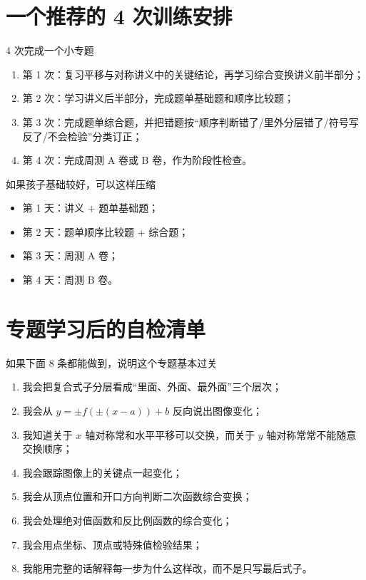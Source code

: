 \documentclass[11pt,a4paper,fontset=fandol]{ctexart}
\begin{document}
\section{一个推荐的 4 次训练安排}

\begin{goalbox}{4 次完成一个小专题}
\begin{enumerate}
  \item 第 1 次：复习平移与对称讲义中的关键结论，再学习综合变换讲义前半部分；
  \item 第 2 次：学习讲义后半部分，完成题单基础题和顺序比较题；
  \item 第 3 次：完成题单综合题，并把错题按“顺序判断错了/里外分层错了/符号写反了/不会检验”分类订正；
  \item 第 4 次：完成周测 A 卷或 B 卷，作为阶段性检查。
\end{enumerate}
\end{goalbox}

\begin{infobox}{如果孩子基础较好，可以这样压缩}
\begin{itemize}
  \item 第 1 天：讲义 + 题单基础题；
  \item 第 2 天：题单顺序比较题 + 综合题；
  \item 第 3 天：周测 A 卷；
  \item 第 4 天：周测 B 卷。
\end{itemize}
\end{infobox}

\section{专题学习后的自检清单}

\begin{goalbox}{如果下面 8 条都能做到，说明这个专题基本过关}
\begin{enumerate}
  \item 我会把复合式子分层看成“里面、外面、最外面”三个层次；
  \item 我会从 \(y=\pm f(\pm(x-a))+b\) 反向说出图像变化；
  \item 我知道关于 \(x\) 轴对称常和水平平移可以交换，而关于 \(y\) 轴对称常常不能随意交换顺序；
  \item 我会跟踪图像上的关键点一起变化；
  \item 我会从顶点位置和开口方向判断二次函数综合变换；
  \item 我会处理绝对值函数和反比例函数的综合变化；
  \item 我会用点坐标、顶点或特殊值检验结果；
  \item 我能用完整的话解释每一步为什么这样改，而不是只写最后式子。
\end{enumerate}
\end{goalbox}
\end{document}
